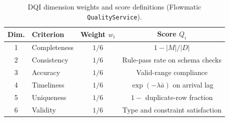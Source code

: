 \begin{table}[H]
  \centering
  \caption{DQI dimension weights and score definitions (Flowmatic \texttt{QualityService}).}
  \label{tab:dqi_weights}
  \small
  \begin{tabular}{@{}clcc@{}}
    \toprule
    \textbf{Dim.} & \textbf{Criterion} & \textbf{Weight $w_i$} & \textbf{Score $Q_i$} \\
    \midrule
    1 & Completeness & $1/6$ & $1 - |M|/|D|$ \\
    2 & Consistency & $1/6$ & Rule-pass rate on schema checks \\
    3 & Accuracy & $1/6$ & Valid-range compliance \\
    4 & Timeliness & $1/6$ & $\exp(-\lambda \bar{a})$ on arrival lag \\
    5 & Uniqueness & $1/6$ & $1 -$ duplicate-row fraction \\
    6 & Validity & $1/6$ & Type and constraint satisfaction \\
    \bottomrule
  \end{tabular}
\end{table}
